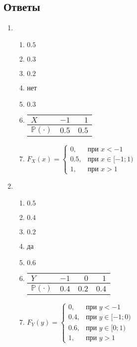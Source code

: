 \documentclass[12pt]{article}
\def \P{\mathbb{P}}
\begin{document}
\subsection*{Ответы}

\begin{enumerate}

\item  
\begin{enumerate}
\item   $0.5 $  
\item   $0.3$   
\item   $0.2$   
\item   нет   
\item   $0.3$    
\item  
\begin{tabular}{lrr}
\toprule
$X$ & $-1$  & $1$   \\ \midrule
$\P(\cdot)$ & $0.5$ & $0.5$ \\ \bottomrule
\end{tabular}   
\item  $F_{X}(x) = \begin{cases} 0, & \mbox{при } x < -1 \\ 0.5 , & \mbox{при } x \in [-1;1) \\ 1, & \mbox{при }  x > 1 \end{cases}$   
\end{enumerate}
\item   
\begin{enumerate}
\item   $0.5$  
\item   $0.4$   
\item   $0.2$  
\item   да    
\item   $0.6$  
\item   
\begin{tabular}{lrrr}
\toprule
$Y$ & $-1$  & $0$   & $1$   \\ \midrule
$\P(\cdot)$ & $0.4$ & $0.2$ & $0.4$ \\ \bottomrule
\end{tabular}  
\item   $F_{Y}(y) = \begin{cases} 0, & \mbox{при } y < -1 \\ 0.4 , & \mbox{при } y \in [-1;0) \\ 0.6, & \mbox{при }  y \in [0;1)\\ 1, & \mbox{при } y > 1 \end{cases}$   
\end{enumerate}


\end{enumerate}
\end{document}
